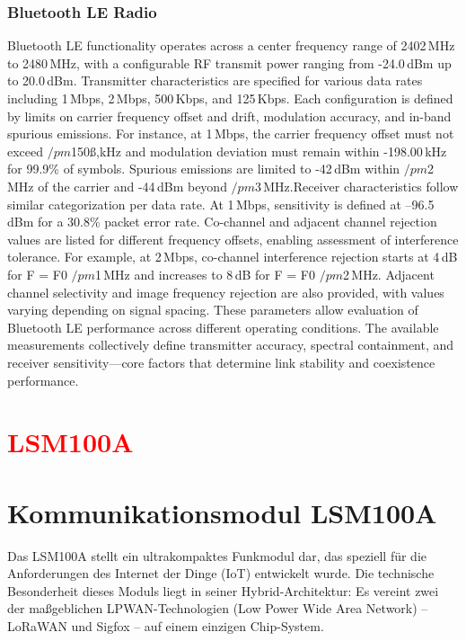 \subsubsection{Bluetooth LE Radio}
Bluetooth LE functionality operates across a center frequency range of 2402\,MHz to 2480\,MHz, with a configurable RF transmit power ranging from -24.0\,dBm up to 20.0\,dBm. Transmitter characteristics are specified for various data rates including 1\,Mbps, 2\,Mbps, 500\,Kbps, and 125\,Kbps. Each configuration is defined by limits on carrier frequency offset and drift, modulation accuracy, and in-band spurious emissions. For instance, at 1\,Mbps, the carrier frequency offset must not exceed $/pm$150ß,kHz and modulation deviation must remain within -198.00\,kHz for 99.9\% of symbols. Spurious emissions are limited to -42\,dBm within $/pm$2\,MHz of the carrier and -44\,dBm beyond $/pm$3\,MHz.Receiver characteristics follow similar categorization per data rate. At 1\,Mbps, sensitivity is defined at –96.5\,dBm for a 30.8\% packet error rate. Co-channel and adjacent channel rejection values are listed for different frequency offsets, enabling assessment of interference tolerance. For example, at 2\,Mbps, co-channel interference rejection starts at 4\,dB for F = F0 $/pm$1\,MHz and increases to 8\,dB for F = F0 $/pm$2\,MHz. Adjacent channel selectivity and image frequency rejection are also provided, with values varying depending on signal spacing. These parameters allow evaluation of Bluetooth LE performance across different operating conditions. The available measurements collectively define transmitter accuracy, spectral containment, and receiver sensitivity—core factors that determine link stability and coexistence performance.

\section{\textcolor{red}{LSM100A}}%
\section{Kommunikationsmodul LSM100A}

Das LSM100A stellt ein ultrakompaktes Funkmodul dar, das speziell für die Anforderungen des Internet der Dinge (IoT) entwickelt wurde. Die technische Besonderheit dieses Moduls liegt in seiner Hybrid-Architektur: Es vereint zwei der maßgeblichen LPWAN-Technologien (Low Power Wide Area Network) -- LoRaWAN und Sigfox -- auf einem einzigen Chip-System.

